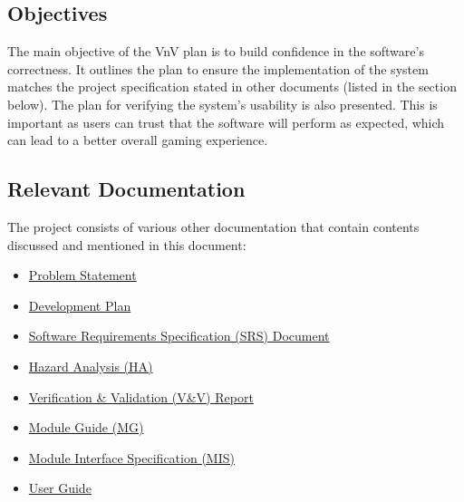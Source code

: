 \documentclass[12pt, titlepage]{article}
\begin{document}
\subsection{Objectives}
The main objective of the VnV plan is to build confidence in the software’s correctness. It outlines the plan to ensure the implementation of the system matches the project specification stated in other documents (listed in the section below). The plan for verifying the system's usability is also presented. This is important as users can trust that the software will perform as expected, which can lead to a better overall gaming experience.


\subsection{Relevant Documentation}
The project consists of various other documentation that contain contents discussed and mentioned in this document:
\begin{itemize}
    \item \href{https://github.com/brandonduong/Farming-Matters/blob/main/docs/ProblemStatementAndGoals/ProblemStatement.pdf}{Problem Statement}
    \item \href{https://github.com/brandonduong/Farming-Matters/blob/main/docs/ProblemStatementAndGoals/ProblemStatement.pdf}{Development Plan}
    \item \href{https://github.com/brandonduong/Farming-Matters/blob/main/docs/DevelopmentPlan/DevelopmentPlan.pdf}{Software Requirements Specification (SRS) Document}
    \item \href{https://github.com/brandonduong/Farming-Matters/blob/main/docs/HazardAnalysis/HazardAnalysis.pdf}{Hazard Analysis (HA)}
    \item \href{https://github.com/brandonduong/Farming-Matters/blob/main/docs/VnVReport/VnVReport.pdf}{Verification \&  Validation (V\&V) Report}
    \item \href{https://github.com/brandonduong/Farming-Matters/blob/main/docs/Design/MG/MG.pdf}{Module Guide (MG)}
    \item \href{https://github.com/brandonduong/Farming-Matters/blob/main/docs/Design/MIS/MIS.pdf}{Module Interface Specification (MIS)}
    \item \href{https://github.com/brandonduong/Farming-Matters/blob/main/docs/UserGuide/UserGuide.pdf}{User Guide}
\end{itemize}

\end{document}
